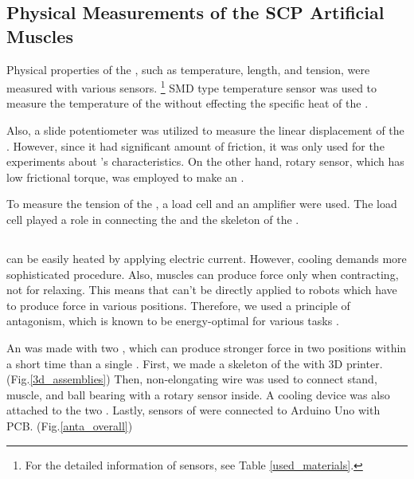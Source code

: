 \subsection{Physical Measurements of the SCP Artificial Muscles}
Physical properties of the \scps, such as temperature, length, and tension, were measured with various sensors.
\footnote{For the detailed information of sensors, see Table \ref{used_materials}.}
SMD type temperature sensor was used to measure the temperature of the \scps without effecting the specific heat of the \scpnospace.

Also, a slide potentiometer was utilized to measure the linear displacement of the \scpsnospace. However, since it had significant amount of friction, it was only used for the experiments about \scpnospace's characteristics. On the other hand, rotary sensor, which has low frictional torque, was employed to make an \antanospace. 

To measure the tension of the \scpsnospace, a load cell and an amplifier were used.
The load cell played a role in connecting the \scps and the skeleton of the \antanospace.

\subsection{\ANTAs}
\scps can be easily heated by applying electric current. However, cooling demands more sophisticated procedure. Also, muscles can produce force only when contracting, not for relaxing. This means that \scps can't be directly applied to robots which have to produce force in various positions.
Therefore, we used a principle of antagonism, which is known to be energy-optimal for various tasks \cite{antagonism}.

An \anta was made with two \scpsnospace, which can produce stronger force in two positions within a short time than a single \scpnospace.
First, we made a skeleton of the \anta with 3D printer. (Fig.\ref{3d_assemblies}) Then, non-elongating wire was used to connect stand, muscle, and ball bearing with a rotary sensor inside. A cooling device was also attached to the two \scpsnospace. Lastly, sensors of \anta were connected to Arduino Uno with PCB. (Fig.\ref{anta_overall})

